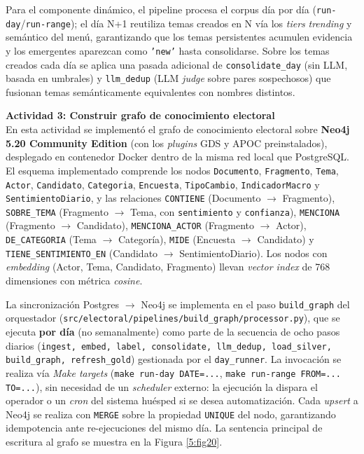 \documentclass[listof=nochaptergap,12pt,times,authoryear]{report}
\begin{document}
Para el componente dinámico, el pipeline procesa el corpus día por día
(\texttt{run-day}/\texttt{run-range}); el día N+1 reutiliza temas creados en N
vía los \textit{tiers} \textit{trending} y semántico del menú, garantizando que
los temas persistentes acumulen evidencia y los emergentes aparezcan como
\texttt{'new'} hasta consolidarse. Sobre los temas creados cada día se aplica una
pasada adicional de \texttt{consolidate\_day} (sin LLM, basada en umbrales) y
\texttt{llm\_dedup} (LLM \textit{judge} sobre pares sospechosos) que fusionan
temas semánticamente equivalentes con nombres distintos.

\textbf{Actividad 3: Construir grafo de conocimiento electoral}
\\
En esta actividad se implementó el grafo de conocimiento electoral sobre
\textbf{Neo4j 5.20 Community Edition} (con los \textit{plugins} GDS y APOC
preinstalados), desplegado en contenedor Docker dentro de la misma red local que
PostgreSQL. El esquema implementado comprende los nodos
\texttt{Documento}, \texttt{Fragmento}, \texttt{Tema}, \texttt{Actor},
\texttt{Candidato}, \texttt{Categoria}, \texttt{Encuesta}, \texttt{TipoCambio},
\texttt{IndicadorMacro} y \texttt{SentimientoDiario}, y las relaciones
\texttt{CONTIENE} (Documento $\rightarrow$ Fragmento), \texttt{SOBRE\_TEMA}
(Fragmento $\rightarrow$ Tema, con \texttt{sentimiento} y \texttt{confianza}),
\texttt{MENCIONA} (Fragmento $\rightarrow$ Candidato), \texttt{MENCIONA\_ACTOR}
(Fragmento $\rightarrow$ Actor), \texttt{DE\_CATEGORIA} (Tema $\rightarrow$
Categoría), \texttt{MIDE} (Encuesta $\rightarrow$ Candidato) y
\texttt{TIENE\_SENTIMIENTO\_EN} (Candidato $\rightarrow$ SentimientoDiario). Los
nodos con \textit{embedding} (Actor, Tema, Candidato, Fragmento) llevan
\textit{vector index} de 768 dimensiones con métrica \textit{cosine}.

La sincronización Postgres $\rightarrow$ Neo4j se implementa en el paso
\texttt{build\_graph} del orquestador
(\texttt{src/electoral/pipelines/build\_graph/processor.py}), que se ejecuta
\textbf{por día} (no semanalmente) como parte de la secuencia de ocho pasos
diarios (\texttt{ingest, embed, label, consolidate, llm\_dedup, load\_silver,
build\_graph, refresh\_gold}) gestionada por el \texttt{day\_runner}. La
invocación se realiza vía \textit{Make targets} (\texttt{make run-day DATE=...},
\texttt{make run-range FROM=... TO=...}), sin necesidad de un \textit{scheduler}
externo: la ejecución la dispara el operador o un \textit{cron} del sistema
huésped si se desea automatización. Cada \textit{upsert} a Neo4j se realiza con
\texttt{MERGE} sobre la propiedad \texttt{UNIQUE} del nodo, garantizando
idempotencia ante re-ejecuciones del mismo día. La sentencia principal de
escritura al grafo se muestra en la Figura \ref{5:fig20}.
\end{document}
